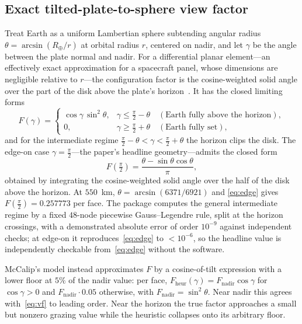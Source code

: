 \documentclass[11pt]{article}
\theoremstyle{remark}
\begin{document}
\subsection{Exact tilted-plate-to-sphere view factor}

Treat Earth as a uniform Lambertian sphere subtending angular radius
$\theta = \arcsin(R_{\oplus}/r)$ at orbital radius $r$, centered on nadir, and let
$\gamma$ be the angle between the plate normal and nadir. For a differential planar
element---an effectively exact approximation for a spacecraft panel, whose
dimensions are negligible relative to $r$---the configuration factor is the
cosine-weighted solid angle over the part of the disk above the plate's
horizon~\cite{howell}. It has the closed limiting forms
\begin{equation}
F(\gamma) =
\begin{cases}
\cos\gamma\,\sin^{2}\theta, & \gamma \le \tfrac{\pi}{2}-\theta \quad(\text{Earth fully above the horizon}),\\[4pt]
0, & \gamma \ge \tfrac{\pi}{2}+\theta \quad(\text{Earth fully set}),
\end{cases}
\label{eq:vf}
\end{equation}
and for the intermediate regime $\tfrac{\pi}{2}-\theta<\gamma<\tfrac{\pi}{2}+\theta$
the horizon clips the disk. The edge-on case $\gamma=\tfrac{\pi}{2}$---the paper's
headline geometry---admits the closed form
\begin{equation}
F\!\left(\tfrac{\pi}{2}\right) = \frac{\theta-\sin\theta\cos\theta}{\pi},
\label{eq:edge}
\end{equation}
obtained by integrating the cosine-weighted solid angle over the half of the disk
above the horizon. At $550$~km, $\theta=\arcsin(6371/6921)$ and
\eqref{eq:edge} gives $F(\tfrac{\pi}{2})=0.257773$ per face. The package computes
the general intermediate regime by a fixed $48$-node piecewise Gauss--Legendre
rule, split at the horizon crossings, with a demonstrated absolute error of order
$10^{-9}$ against independent checks; at edge-on it reproduces~\eqref{eq:edge} to
$<\!10^{-6}$, so the headline value is
independently checkable from~\eqref{eq:edge} without the software.

McCalip's model instead approximates $F$ by a cosine-of-tilt expression with a
lower floor at $5\%$ of the nadir value: per face,
$F_{\mathrm{heur}}(\gamma)=F_{\mathrm{nadir}}\cos\gamma$ for $\cos\gamma>0$ and
$F_{\mathrm{nadir}}\cdot0.05$ otherwise, with
$F_{\mathrm{nadir}}=\sin^{2}\theta$. Near nadir this agrees with~\eqref{eq:vf} to
leading order. Near the horizon the true factor approaches a small but nonzero
grazing value while the heuristic collapses onto its arbitrary floor.
\end{document}
